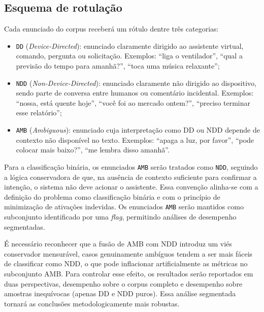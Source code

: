 \documentclass[
    12pt,                %
    openright,           %
    oneside,             %
    a4paper,             %
    english,             %
    brazil               %
]{abntex2}
\begin{document}
\subsection{Esquema de rotulação}
\label{sec:rotulacao}

Cada enunciado do corpus receberá um rótulo dentre três categorias:

\begin{itemize}
    \item \texttt{DD} (\textit{Device-Directed}): enunciado claramente dirigido ao assistente virtual, comando, pergunta ou solicitação. Exemplos: ``liga o ventilador'', ``qual a previsão do tempo para amanhã?'', ``toca uma música relaxante'';

    \item \texttt{NDD} (\textit{Non-Device-Directed}): enunciado claramente não dirigido ao dispositivo, sendo parte de conversa entre humanos ou comentário incidental. Exemplos: ``nossa, está quente hoje'', ``você foi ao mercado ontem?'', ``preciso terminar esse relatório'';

    \item \texttt{AMB} (\textit{Ambiguous}): enunciado cuja interpretação como DD ou NDD depende de contexto não disponível no texto. Exemplos: ``apaga a luz, por favor'', ``pode colocar mais baixo?'', ``me lembra disso amanhã''.
\end{itemize}

Para a classificação binária, os enunciados \texttt{AMB} serão tratados como \texttt{NDD}, seguindo a lógica conservadora de que, na ausência de contexto suficiente para confirmar a intenção, o sistema não deve acionar o assistente. Essa convenção alinha-se com a definição do problema como classificação binária \cite{Mallidi2018} e com o princípio de minimização de ativações indevidas. Os enunciados \texttt{AMB} serão mantidos como subconjunto identificado por uma \textit{flag}, permitindo análises de desempenho segmentadas.

É necessário reconhecer que a fusão de AMB com NDD introduz um viés conservador mensurável, casos genuinamente ambíguos tendem a ser mais fáceis de classificar como NDD, o que pode inflacionar artificialmente as métricas no subconjunto AMB. Para controlar esse efeito, os resultados serão reportados em duas perspectivas, desempenho sobre o corpus completo e desempenho sobre amostras inequívocas (apenas DD e NDD puros). Essa análise segmentada tornará as conclusões metodologicamente mais robustas.
\end{document}
